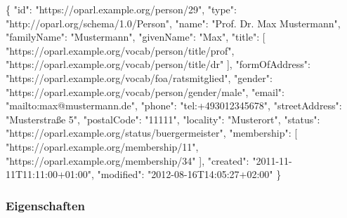 \documentclass[,a4paper]{article}
\newenvironment{Shaded}{}{}
\newcommand{\DataTypeTok}[1]{\textcolor[rgb]{0.56,0.13,0.00}{{#1}}}
\newcommand{\StringTok}[1]{\textcolor[rgb]{0.25,0.44,0.63}{{#1}}}
\newcommand{\OtherTok}[1]{\textcolor[rgb]{0.00,0.44,0.13}{{#1}}}
\newcommand{\FunctionTok}[1]{\textcolor[rgb]{0.02,0.16,0.49}{{#1}}}
\begin{document}
\begin{Shaded}
\begin{Highlighting}[]
\FunctionTok{\{}
    \DataTypeTok{"id"}\FunctionTok{:} \StringTok{"https://oparl.example.org/person/29"}\FunctionTok{,}
    \DataTypeTok{"type"}\FunctionTok{:} \StringTok{"http://oparl.org/schema/1.0/Person"}\FunctionTok{,}
    \DataTypeTok{"name"}\FunctionTok{:} \StringTok{"Prof. Dr. Max Mustermann"}\FunctionTok{,}
    \DataTypeTok{"familyName"}\FunctionTok{:} \StringTok{"Mustermann"}\FunctionTok{,}
    \DataTypeTok{"givenName"}\FunctionTok{:} \StringTok{"Max"}\FunctionTok{,}
    \DataTypeTok{"title"}\FunctionTok{:} \OtherTok{[}
        \StringTok{"https://oparl.example.org/vocab/person/title/prof"}\OtherTok{,}
        \StringTok{"https://oparl.example.org/vocab/person/title/dr"}
    \OtherTok{]}\FunctionTok{,}
    \DataTypeTok{"formOfAddress"}\FunctionTok{:} \StringTok{"https://oparl.example.org/vocab/foa/ratsmitglied"}\FunctionTok{,}
    \DataTypeTok{"gender"}\FunctionTok{:} \StringTok{"https://oparl.example.org/vocab/person/gender/male"}\FunctionTok{,}
    \DataTypeTok{"email"}\FunctionTok{:} \StringTok{"mailto:max@mustermann.de"}\FunctionTok{,}
    \DataTypeTok{"phone"}\FunctionTok{:} \StringTok{"tel:+493012345678"}\FunctionTok{,}
    \DataTypeTok{"streetAddress"}\FunctionTok{:} \StringTok{"Musterstraße 5"}\FunctionTok{,}
    \DataTypeTok{"postalCode"}\FunctionTok{:} \StringTok{"11111"}\FunctionTok{,}
    \DataTypeTok{"locality"}\FunctionTok{:} \StringTok{"Musterort"}\FunctionTok{,}
    \DataTypeTok{"status"}\FunctionTok{:} \StringTok{"https://oparl.example.org/status/buergermeister"}\FunctionTok{,}
    \DataTypeTok{"membership"}\FunctionTok{:} \OtherTok{[}
        \StringTok{"https://oparl.example.org/membership/11"}\OtherTok{,}
        \StringTok{"https://oparl.example.org/membership/34"}
    \OtherTok{]}\FunctionTok{,}
    \DataTypeTok{"created"}\FunctionTok{:} \StringTok{"2011-11-11T11:11:00+01:00"}\FunctionTok{,}
    \DataTypeTok{"modified"}\FunctionTok{:} \StringTok{"2012-08-16T14:05:27+02:00"}
\FunctionTok{\}}
\end{Highlighting}
\end{Shaded}

\subsubsection{Eigenschaften}\label{eigenschaften-3}
\end{document}
